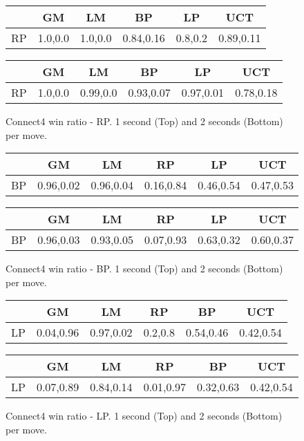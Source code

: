 \documentclass[double,12pt]{beavtex}
\begin{document}
\begin{figure}
\centering
\begin{tabular}{|c|c|c|c|c|c|} 
 \hline
  & GM & LM & BP & LP & UCT \\
 \hline
 RP & 1.0,0.0 & 1.0,0.0 & 0.84,0.16 & 0.8,0.2 & 0.89,0.11 \\
 \hline
\end{tabular}
\linebreak
\linebreak
\linebreak
\begin{tabular}{|c|c|c|c|c|c|} 
 \hline
  & GM & LM & BP & LP & UCT \\
 \hline
 RP & 1.0,0.0 & 0.99,0.0 & 0.93,0.07 & 0.97,0.01 & 0.78,0.18 \\
 \hline
\end{tabular}
\caption{Connect4 win ratio - RP. 1 second (Top) and 2 seconds (Bottom) per move.}
\end{figure}

\begin{figure}
\centering
\begin{tabular}{|c|c|c|c|c|c|} 
 \hline
  & GM & LM & RP & LP & UCT \\
 \hline
 BP & 0.96,0.02 & 0.96,0.04 & 0.16,0.84 & 0.46,0.54 & 0.47,0.53 \\
 \hline
\end{tabular}
\linebreak
\linebreak
\linebreak
\begin{tabular}{|c|c|c|c|c|c|} 
 \hline
  & GM & LM & RP & LP & UCT \\
 \hline
 BP & 0.96,0.03 & 0.93,0.05 & 0.07,0.93 & 0.63,0.32 & 0.60,0.37 \\
 \hline
\end{tabular}
\caption{Connect4 win ratio - BP. 1 second (Top) and 2 seconds (Bottom) per move.}
\end{figure}

\begin{figure}
\centering
\begin{tabular}{|c|c|c|c|c|c|} 
 \hline
  & GM & LM & RP & BP & UCT \\
 \hline
 LP & 0.04,0.96 & 0.97,0.02 & 0.2,0.8 & 0.54,0.46 & 0.42,0.54 \\
 \hline
\end{tabular}
\linebreak
\linebreak
\linebreak
\begin{tabular}{|c|c|c|c|c|c|} 
 \hline
  & GM & LM & RP & BP & UCT \\
 \hline
 LP & 0.07,0.89 & 0.84,0.14 & 0.01,0.97 & 0.32,0.63 & 0.42,0.54 \\
 \hline
\end{tabular}
\caption{Connect4 win ratio - LP. 1 second (Top) and 2 seconds (Bottom) per move.}
\end{figure}
\end{document}
